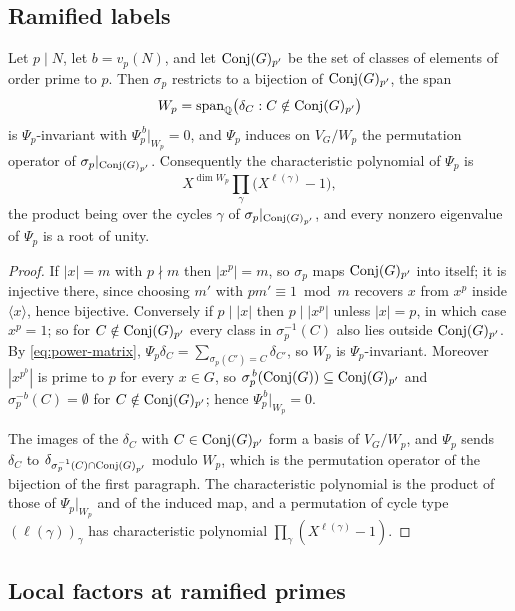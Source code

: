 \subsection{Ramified labels}

\begin{theorem}
\label{thm:ramified-spectrum}
Let \(p\mid N\), let \(b=v_p(N)\), and let \(\operatorname{Conj}(G)_{p'}\) be the set of
classes of elements of order prime to \(p\).  Then \(\sigma_p\) restricts to a
bijection of \(\operatorname{Conj}(G)_{p'}\), the span
\[
 W_p=\operatorname{span}_\mathbb Q\bigl(\delta_C:C\notin\operatorname{Conj}(G)_{p'}\bigr)
\]
is \(\Psi_p\)-invariant with \(\Psi_p^{\,b}|_{W_p}=0\), and \(\Psi_p\) induces
on \(V_G/W_p\) the permutation operator of \(\sigma_p|_{\operatorname{Conj}(G)_{p'}}\).
Consequently the characteristic polynomial of \(\Psi_p\) is
\[
 X^{\dim W_p}\prod_{\gamma}\bigl(X^{\ell(\gamma)}-1\bigr),
\]
the product being over the cycles \(\gamma\) of
\(\sigma_p|_{\operatorname{Conj}(G)_{p'}}\), and every nonzero eigenvalue of \(\Psi_p\) is a
root of unity.
\end{theorem}

\begin{proof}
If \(|x|=m\) with \(p\nmid m\) then \(|x^p|=m\), so \(\sigma_p\) maps
\(\operatorname{Conj}(G)_{p'}\) into itself; it is injective there, since choosing \(m'\)
with \(pm'\equiv1\bmod m\) recovers \(x\) from \(x^p\) inside
\(\langle x\rangle\), hence bijective.  Conversely if \(p\mid|x|\) then
\(p\mid|x^p|\) unless \(|x|=p\), in which case \(x^p=1\); so for
\(C\notin\operatorname{Conj}(G)_{p'}\) every class in \(\sigma_p^{-1}(C)\) also lies outside
\(\operatorname{Conj}(G)_{p'}\).  By \eqref{eq:power-matrix},
\(\Psi_p\delta_C=\sum_{\sigma_p(C')=C}\delta_{C'}\), so \(W_p\) is
\(\Psi_p\)-invariant.  Moreover \(|x^{p^{b}}|\) is prime to \(p\) for every
\(x\in G\), so \(\sigma_p^{\,b}(\operatorname{Conj}(G))\subseteq\operatorname{Conj}(G)_{p'}\) and
\(\sigma_p^{-b}(C)=\emptyset\) for \(C\notin\operatorname{Conj}(G)_{p'}\); hence
\(\Psi_p^{\,b}|_{W_p}=0\).

The images of the \(\delta_C\) with \(C\in\operatorname{Conj}(G)_{p'}\) form a basis of
\(V_G/W_p\), and \(\Psi_p\) sends \(\delta_C\) to
\(\delta_{\sigma_p^{-1}(C)\cap\operatorname{Conj}(G)_{p'}}\) modulo \(W_p\), which is the
permutation operator of the bijection of the first paragraph.  The
characteristic polynomial is the product of those of \(\Psi_p|_{W_p}\) and of
the induced map, and a permutation of cycle type \((\ell(\gamma))_\gamma\) has
characteristic polynomial \(\prod_\gamma(X^{\ell(\gamma)}-1)\).
\end{proof}

\subsection{Local factors at ramified primes}
\label{sec:ramified-completion}

